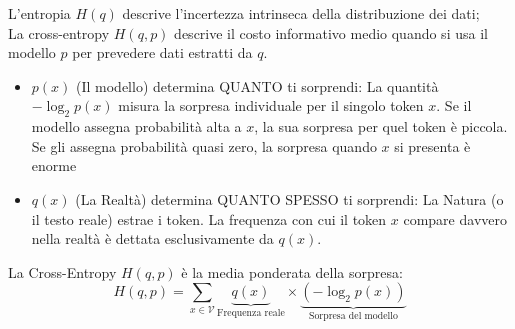 L'entropia $H(q)$ descrive l'incertezza intrinseca della distribuzione dei dati; 
\\
La cross-entropy $H(q,p)$ descrive il costo informativo medio quando si usa il modello $p$ per prevedere dati estratti da $q$.
\begin{itemize}
    \item $p(x)$ (Il modello) determina QUANTO ti sorprendi:
La quantità $-\log_2 p(x)$ misura la sorpresa individuale per il singolo token $x$. Se il modello assegna probabilità alta a $x$, la sua sorpresa per quel token è piccola. Se gli assegna probabilità quasi zero, la sorpresa quando $x$ si presenta è enorme
    \item $q(x)$ (La Realtà) determina QUANTO SPESSO ti sorprendi:
La Natura (o il testo reale) estrae i token. La frequenza con cui il token $x$ compare davvero nella realtà è dettata esclusivamente da $q(x)$.
\end{itemize}
La Cross-Entropy $H(q,p)$ è la media ponderata della sorpresa:$$H(q, p) = \sum_{x \in \mathcal{V}} \underbrace{q(x)}_{\text{Frequenza reale}} \times \underbrace{\left(-\log_2 p(x)\right)}_{\text{Sorpresa del modello}}$$
